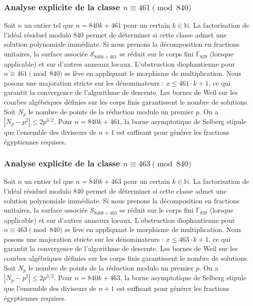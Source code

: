 \documentclass[11pt,a4paper]{article}
\begin{document}
\subsubsection{Analyse explicite de la classe $n \equiv 461 \pmod{840}$}
Soit $n$ un entier tel que $n = 840k + 461$ pour un certain $k \in \mathbb{N}$.
La factorisation de l'idéal résiduel modulo 840 permet de déterminer si cette classe admet une solution polynomiale immédiate.
Si nous prenons la décomposition en fractions unitaires, la surface associée $\mathcal{S}_{840k+461}$ se réduit sur le corps fini $\mathbb{F}_{839}$ (lorsque applicable) et sur d'autres anneaux locaux.
L'obstruction diophantienne pour $n \equiv 461 \pmod{840}$ se lève en appliquant le morphisme de multiplication.
Nous posons une majoration stricte sur les dénominateurs : $x \le 461 \cdot k + 1$, ce qui garantit la convergence de l'algorithme de descente.
Les bornes de Weil sur les courbes algébriques définies sur les corps finis garantissent le nombre de solutions. Soit $N_p$ le nombre de points de la réduction modulo un premier $p$.
On a $|N_p - p^2| \le 2 p^{3/2}$.
Pour $n = 840k + 461$, la borne asymptotique de Selberg stipule que l'ensemble des diviseurs de $n+1$ est suffisant pour générer les fractions égyptiennes requises.

\subsubsection{Analyse explicite de la classe $n \equiv 463 \pmod{840}$}
Soit $n$ un entier tel que $n = 840k + 463$ pour un certain $k \in \mathbb{N}$.
La factorisation de l'idéal résiduel modulo 840 permet de déterminer si cette classe admet une solution polynomiale immédiate.
Si nous prenons la décomposition en fractions unitaires, la surface associée $\mathcal{S}_{840k+463}$ se réduit sur le corps fini $\mathbb{F}_{839}$ (lorsque applicable) et sur d'autres anneaux locaux.
L'obstruction diophantienne pour $n \equiv 463 \pmod{840}$ se lève en appliquant le morphisme de multiplication.
Nous posons une majoration stricte sur les dénominateurs : $x \le 463 \cdot k + 1$, ce qui garantit la convergence de l'algorithme de descente.
Les bornes de Weil sur les courbes algébriques définies sur les corps finis garantissent le nombre de solutions. Soit $N_p$ le nombre de points de la réduction modulo un premier $p$.
On a $|N_p - p^2| \le 2 p^{3/2}$.
Pour $n = 840k + 463$, la borne asymptotique de Selberg stipule que l'ensemble des diviseurs de $n+1$ est suffisant pour générer les fractions égyptiennes requises.
\end{document}
